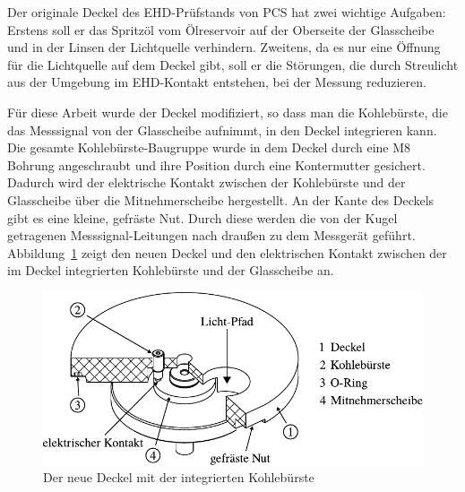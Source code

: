 Der originale Deckel des EHD-Prüfstands von PCS hat zwei wichtige Aufgaben:
Erstens soll er das Spritzöl vom Ölreservoir auf der Oberseite der Glasscheibe und in der Linsen der Lichtquelle verhindern.
Zweitens, da es nur eine Öffnung für die Lichtquelle auf dem Deckel gibt, soll er die Störungen, die durch Streulicht aus der Umgebung im EHD-Kontakt entstehen, bei der Messung reduzieren.

Für diese Arbeit wurde der Deckel modifiziert, so dass man die Kohlebürste, die das Messsignal von der Glasscheibe aufnimmt, in den Deckel integrieren kann.
Die gesamte Kohlebürste-Baugruppe wurde in dem Deckel durch eine M8 Bohrung angeschraubt und ihre Position durch eine Kontermutter gesichert.
Dadurch wird der elektrische Kontakt zwischen der Kohlebürste und der Glasscheibe über die Mitnehmerscheibe hergestellt.
An der Kante des Deckels gibt es eine kleine, gefräste Nut.
Durch diese werden die von der Kugel getragenen Messsignal-Leitungen nach draußen zu dem Messgerät geführt.
Abbildung~\ref{fig:deckel_mit_kohlebuersten} zeigt den neuen Deckel und den elektrischen Kontakt zwischen der im Deckel integrierten Kohlebürste und der Glasscheibe an.

\begin{figure}[htb]
    \centering
    \includegraphics[]{./images/deckel_und_scheibe.pdf}
    \caption{Der neue Deckel mit der integrierten Kohlebürste}
    \label{fig:deckel_mit_kohlebuersten}
\end{figure}

